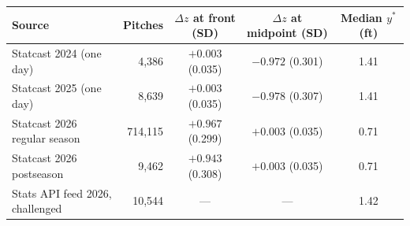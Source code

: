 \begin{tabular}{lrccc}
\toprule
Source & Pitches & $\Delta z$ at front (SD) & $\Delta z$ at midpoint (SD) & Median $y^*$ (ft) \\
\midrule
Statcast 2024 (one day) & 4{,}386 & $+0.003$ (0.035) & $-0.972$ (0.301) & 1.41 \\
Statcast 2025 (one day) & 8{,}639 & $+0.003$ (0.035) & $-0.978$ (0.307) & 1.41 \\
Statcast 2026 regular season & 714{,}115 & $+0.967$ (0.299) & $+0.003$ (0.035) & 0.71 \\
Statcast 2026 postseason & 9{,}462 & $+0.943$ (0.308) & $+0.003$ (0.035) & 0.71 \\
Stats API feed 2026, challenged & 10{,}544 & --- & --- & 1.42 \\
\bottomrule
\end{tabular}
